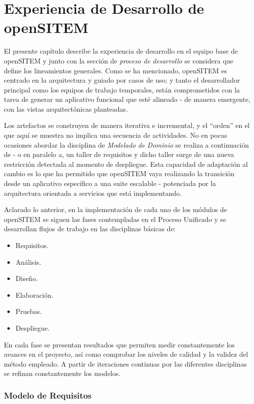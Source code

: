 \chapter{Experiencia de Desarrollo de openSITEM}

El presente capítulo describe la experiencia de desarrollo en el equipo base de openSITEM y junto con la sección de \textit{proceso de desarrollo} se considera que define los lineamientos generales. Como se ha mencionado, openSITEM es centrado en la arquitectura y guiado por casos de uso; y tanto el desarrollador principal como los equipos de trabajo temporales, están comprometidos con la tarea de generar un aplicativo funcional que esté alineado - de manera emergente, con las vistas arquitectónicas planteadas.

Los artefactos se construyen de manera iterativa e incremental, y el ``orden'' en el que aquí se muestra no implica una secuencia de actividades. No en pocas ocasiones abordar la disciplina de \textit{Modelado de Dominio} se realiza a continuación de - o en paralelo a, un taller de requisitos y dicho taller surge de una nueva restricción detectada al momento de despliegue. Esta capacidad de adaptación al cambio es lo que ha permitido que openSITEM vaya realizando la transición desde un aplicativo específico a una suite escalable - potenciada por la arquitectura orientada a servicios que está implementando.

Aclarado lo anterior, en la implementación de cada uno de los módulos de openSITEM se siguen las fases contempladas en el Proceso Unificado y se desarrollan flujos de trabajo en las disciplinas básicas de:
\begin{itemize}
\item Requisitos.
\item Análisis.
\item Diseño.
\item Elaboración.
\item Pruebas.
\item Despliegue.
\end{itemize}

En cada fase se presentan resultados que permiten medir constantemente los avances en el proyecto, así como comprobar los niveles de calidad y la validez del método empleado. A partir de iteraciones continuas por las diferentes disciplinas se refinan constantemente los modelos.

\subsection{Modelo de Requisitos}

